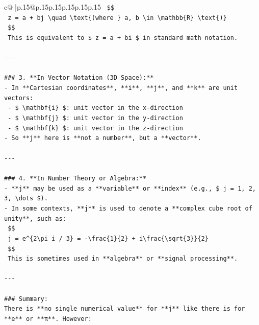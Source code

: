 \documentclass{article}
\begin{document}
{\begin{supertabular}{c@{$\;$}|p{.15\linewidth}@{}p{.15\linewidth}p{.15\linewidth}p{.15\linewidth}p{.15\linewidth}p{.15\linewidth}}
{{{\texttt{  \$\$} \\
\texttt{  z = a + bj \textbackslash{}quad \textbackslash{}text\{(where \} a, b \textbackslash{}in \textbackslash{}mathbb\{R\} \textbackslash{}text\{)\}} \\
\texttt{  \$\$} \\
\texttt{  This is equivalent to \$ z = a + bi \$ in standard math notation.} \\
\\ 
\texttt{{-}{-}{-}} \\
\\ 
\texttt{\#\#\# 3. **In Vector Notation (3D Space):**} \\
\texttt{{-} In **Cartesian coordinates**, **i**, **j**, and **k** are unit vectors:} \\
\texttt{  {-} \$ \textbackslash{}mathbf\{i\} \$: unit vector in the x{-}direction} \\
\texttt{  {-} \$ \textbackslash{}mathbf\{j\} \$: unit vector in the y{-}direction} \\
\texttt{  {-} \$ \textbackslash{}mathbf\{k\} \$: unit vector in the z{-}direction} \\
\texttt{{-} So **j** here is **not a number**, but a **vector**.} \\
\\ 
\texttt{{-}{-}{-}} \\
\\ 
\texttt{\#\#\# 4. **In Number Theory or Algebra:**} \\
\texttt{{-} **j** may be used as a **variable** or **index** (e.g., \$ j = 1, 2, 3, \textbackslash{}dots \$).} \\
\texttt{{-} In some contexts, **j** is used to denote a **complex cube root of unity**, such as:} \\
\texttt{  \$\$} \\
\texttt{  j = e\^{}\{2\textbackslash{}pi i / 3\} = {-}\textbackslash{}frac\{1\}\{2\} + i\textbackslash{}frac\{\textbackslash{}sqrt\{3\}\}\{2\}} \\
\texttt{  \$\$} \\
\texttt{  This is sometimes used in **algebra** or **signal processing**.} \\
\\ 
\texttt{{-}{-}{-}} \\
\\ 
\texttt{\#\#\# Summary:} \\
\texttt{There is **no single numerical value** for **j** like there is for **e** or **π**. However:} \\
}}}
\end{supertabular}}
\end{document}

